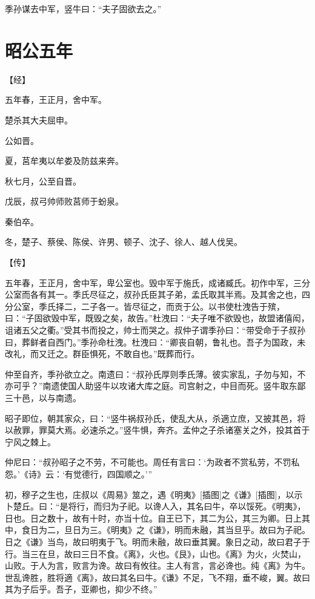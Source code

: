 \documentclass[a4paper,12pt,UTF8,twoside]{ctexbook}
\begin{document}
季孙谋去中军，竖牛曰：“夫子固欲去之。”


\section{昭公五年}



【经】

五年春，王正月，舍中军。

楚杀其大夫屈申。

公如晋。

夏，莒牟夷以牟娄及防兹来奔。

秋七月，公至自晋。

戊辰，叔弓帅师败莒师于蚡泉。

秦伯卒。

冬，楚子、蔡侯、陈侯、许男、顿子、沈子、徐人、越人伐吴。

【传】

五年春，王正月，舍中军，卑公室也。毁中军于施氏，成诸臧氏。初作中军，三分公室而各有其一。季氏尽征之，叔孙氏臣其子弟，孟氏取其半焉。及其舍之也，四分公室，季氏择二，二子各一。皆尽征之，而贡于公。以书使杜洩告于殡，曰：“子固欲毁中军，既毁之矣，故告。”杜洩曰：“夫子唯不欲毁也，故盟诸僖闳，诅诸五父之衢。”受其书而投之，帅士而哭之。叔仲子谓季孙曰：“带受命于子叔孙曰，葬鲜者自西门。”季孙命杜洩。杜洩曰：“卿丧自朝，鲁礼也。吾子为国政，未改礼，而又迁之。群臣惧死，不敢自也。”既葬而行。

仲至自齐，季孙欲立之。南遗曰：“叔孙氏厚则季氏薄。彼实家乱，子勿与知，不亦可乎？”南遗使国人助竖牛以攻诸大库之庭。司宫射之，中目而死。竖牛取东鄙三十邑，以与南遗。

昭子即位，朝其家众，曰：“竖牛祸叔孙氏，使乱大从，杀適立庶，又披其邑，将以赦罪，罪莫大焉。必速杀之。”竖牛惧，奔齐。孟仲之子杀诸塞关之外，投其首于宁风之棘上。

仲尼曰：“叔孙昭子之不劳，不可能也。周任有言曰：‘为政者不赏私劳，不罚私怨。’《诗》云：‘有觉德行，四国顺之。’”

初，穆子之生也，庄叔以《周易》筮之，遇《明夷》[插图]之《谦》[插图]，以示卜楚丘。曰：“是将行，而归为子祀。以谗人入，其名曰牛，卒以馁死。《明夷》，日也。日之数十，故有十时，亦当十位。自王已下，其二为公，其三为卿。日上其中，食日为二，旦日为三。《明夷》之《谦》，明而未融，其当旦乎。故曰为子祀。日之《谦》当鸟，故曰明夷于飞。明而未融，故曰垂其翼。象日之动，故曰君子于行。当三在旦，故曰三日不食。《离》，火也。《艮》，山也。《离》为火，火焚山，山败。于人为言，败言为谗。故曰有攸往。主人有言，言必谗也。纯《离》为牛。世乱谗胜，胜将適《离》，故曰其名曰牛。《谦》不足，飞不翔，垂不峻，翼。故曰其为子后乎。吾子，亚卿也，抑少不终。”
\end{document}
